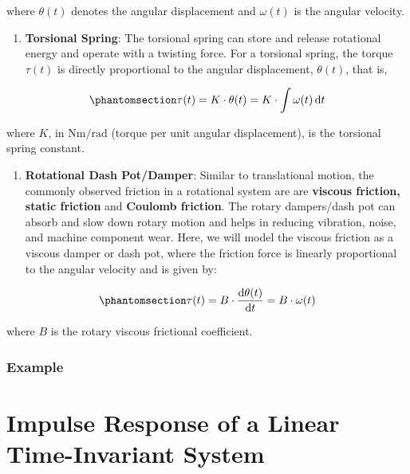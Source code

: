 \documentclass[
  14pt,
  a4paper,
  oneside,
  open=any,
  a4paper,
  14pt]{report}
\providecommand{\tightlist}{%
  \setlength{\itemsep}{0pt}\setlength{\parskip}{0pt}}\usepackage{longtable,booktabs,array}
\begin{document}
where \(\theta(t)\) denotes the angular displacement and \(\omega(t)\)
is the angular velocity.

\begin{enumerate}
\def\labelenumi{\arabic{enumi}.}
\setcounter{enumi}{1}
\tightlist
\item
  \textbf{Torsional Spring}: The torsional spring can store and release
  rotational energy and operate with a twisting force. For a torsional
  spring, the torque \(\tau(t)\) is directly proportional to the angular
  displacement, \(\theta(t)\), that is,
\end{enumerate}

\begin{equation}\phantomsection\label{eq-mechsys-torsional-spring}{
    \tau(t) = K\cdot\theta(t) = K\cdot\int \omega(t) \odif{t}
}\end{equation}

where \(K\), in \(\unit{\newton\meter\per\radian}\) (torque per unit
angular displacement), is the torsional spring constant.

\begin{enumerate}
\def\labelenumi{\arabic{enumi}.}
\setcounter{enumi}{2}
\tightlist
\item
  \textbf{Rotational Dash Pot/Damper}: Similar to translational motion,
  the commonly observed friction in a rotational system are are
  \textbf{viscous friction, static friction} and \textbf{Coulomb
  friction}. The rotary dampers/dash pot can absorb and slow down rotary
  motion and helps in reducing vibration, noise, and machine component
  wear. Here, we will model the viscous friction as a viscous damper or
  dash pot, where the friction force is linearly proportional to the
  angular velocity and is given by:
\end{enumerate}

\begin{equation}\phantomsection\label{eq-mechsys-rotational-damper}{
    \tau(t) = B\cdot \odv{\theta(t)}{t} = B\cdot \omega(t)
}\end{equation}

where \(B\) is the rotary viscous frictional coefficient.

\subsubsection{Example}\label{example-1}

\section{Impulse Response of a Linear Time-Invariant
System}\label{impulse-response-of-a-linear-time-invariant-system}
\end{document}
